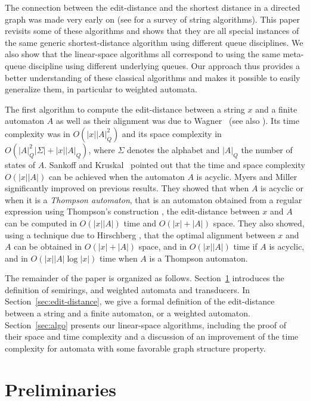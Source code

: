 \documentclass{llncs}
\newcommand{\0}{\overline{0}}
\newcommand{\1}{\overline{1}}
\newcommand{\+}{\oplus}
\renewcommand{\.}{\otimes}
\begin{document}
The connection between the edit-distance and the shortest distance in
a directed graph was made very early on (see
\cite{gusfield,crochemore-hancart-lecroq,crochemore-rytter,crochemore-rytter02}
for a survey of string algorithms). This paper revisits some of these
algorithms and shows that they are all special instances of the same
generic shortest-distance algorithm using different queue
disciplines. We also show that the linear-space algorithms all
correspond to using the same meta-queue discipline using different
underlying queues. Our approach thus provides a better understanding
of these classical algorithms and makes it possible to easily
generalize them, in particular to weighted automata.

The first algorithm to compute the edit-distance between a string $x$
and a finite automaton $A$ as well as their alignment was due to
Wagner~\cite{wagner} (see also \cite{wagner-seiferas}). Its time
complexity was in $O(|x| |A|_Q^2)$ and its space complexity in
$O(|A|_Q^2 |\Sigma| + |x| |A|_Q)$, where $\Sigma$ denotes the alphabet
and $|A|_Q$ the number of states of $A$. Sankoff and
Kruskal~\cite{sankoff} pointed out that the time and space complexity
$O(|x| |A|)$ can be achieved when the automaton $A$ is acyclic. Myers
and Miller~\cite{myers-miller89} significantly improved on previous
results. They showed that when $A$ is acyclic or when it is a
\emph{Thompson automaton}, that is an automaton obtained from a
regular expression using Thompson's construction \cite{thompson}, the
edit-distance between $x$ and $A$ can be computed in $O(|x| |A|)$ time
and $O(|x| + |A|)$ space. They also showed, using a technique due to
Hirschberg \cite{hirschberg}, that the optimal alignment between $x$
and $A$ can be obtained in $O(|x| + |A|)$ space, and in $O(|x| |A|)$
time if $A$ is acyclic, and in $O(|x| |A| \log |x|)$ time when $A$ is
a Thompson automaton.

The remainder of the paper is organized as
follows. Section~\ref{sec:preliminaries} introduces the definition of
semirings, and weighted automata and transducers. In
Section~\ref{sec:edit-distance}, we give a formal definition of the
edit-distance between a string and a finite automaton, or a weighted
automaton. Section~\ref{sec:algo} presents our linear-space
algorithms, including the proof of their space and time complexity and
a discussion of an improvement of the time complexity for automata
with some favorable graph structure property.

\section{Preliminaries}
\label{sec:preliminaries}
\end{document}
